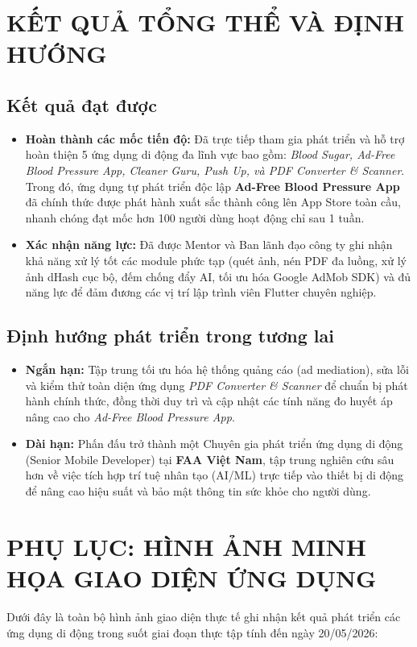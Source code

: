 \documentclass[12pt, a4paper]{article}
\begin{document}
\section{KẾT QUẢ TỔNG THỂ VÀ ĐỊNH HƯỚNG}

\subsection{Kết quả đạt được}
\begin{itemize}
    \item \textbf{Hoàn thành các mốc tiến độ:} Đã trực tiếp tham gia phát triển và hỗ trợ hoàn thiện 5 ứng dụng di động đa lĩnh vực bao gồm: \textit{Blood Sugar, Ad-Free Blood Pressure App, Cleaner Guru, Push Up, và PDF Converter \& Scanner}. Trong đó, ứng dụng tự phát triển độc lập \textbf{Ad-Free Blood Pressure App} đã chính thức được phát hành xuất sắc thành công lên App Store toàn cầu, nhanh chóng đạt mốc hơn 100 người dùng hoạt động chỉ sau 1 tuần.
    \item \textbf{Xác nhận năng lực:} Đã được Mentor và Ban lãnh đạo công ty ghi nhận khả năng xử lý tốt các module phức tạp (quét ảnh, nén PDF đa luồng, xử lý ảnh dHash cục bộ, đếm chống đẩy AI, tối ưu hóa Google AdMob SDK) và đủ năng lực để đảm đương các vị trí lập trình viên Flutter chuyên nghiệp.
\end{itemize}

\subsection{Định hướng phát triển trong tương lai}
\begin{itemize}
    \item \textbf{Ngắn hạn:} Tập trung tối ưu hóa hệ thống quảng cáo (ad mediation), sửa lỗi và kiểm thử toàn diện ứng dụng \textit{PDF Converter \& Scanner} để chuẩn bị phát hành chính thức, đồng thời duy trì và cập nhật các tính năng đo huyết áp nâng cao cho \textit{Ad-Free Blood Pressure App}.
    \item \textbf{Dài hạn:} Phấn đấu trở thành một Chuyên gia phát triển ứng dụng di động (Senior Mobile Developer) tại \textbf{FAA Việt Nam}, tập trung nghiên cứu sâu hơn về việc tích hợp trí tuệ nhân tạo (AI/ML) trực tiếp vào thiết bị di động để nâng cao hiệu suất và bảo mật thông tin sức khỏe cho người dùng.
\end{itemize}

\newpage
\section*{PHỤ LỤC: HÌNH ẢNH MINH HỌA GIAO DIỆN ỨNG DỤNG}
Dưới đây là toàn bộ hình ảnh giao diện thực tế ghi nhận kết quả phát triển các ứng dụng di động trong suốt giai đoạn thực tập tính đến ngày 20/05/2026:
\end{document}
